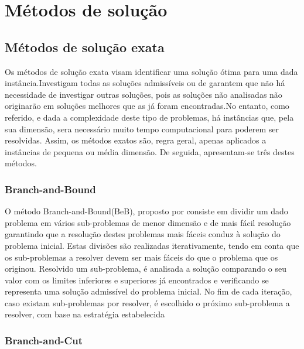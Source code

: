 ﻿\chapter{Métodos de solução}
\label{cap:Metodos_sol}

\section{Métodos de solução exata}
 

Os métodos de solução exata visam identificar uma solução ótima para uma dada instância.Investigam todas as soluções admissíveis ou de garantem que não há necessidade de investigar outras soluções, pois as soluções não analisadas não originarão em soluções melhores que as já foram encontradas.No entanto, como referido, e dada a complexidade deste tipo de problemas, há instâncias que, pela sua dimensão, sera necessário muito tempo computacional para poderem ser resolvidas. Assim, os métodos exatos são, regra geral, apenas aplicados a instâncias de pequena ou média dimensão. De seguida, apresentam-se três destes métodos.
 
\subsection{Branch-and-Bound}

O método Branch-and-Bound(BeB), proposto por \cite{land60}consiste em dividir um dado problema em vários sub-problemas de menor dimensão e de mais fácil resolução garantindo que a resolução destes problemas mais fáceis conduz à solução do problema inicial. Estas divisões são realizadas iterativamente, tendo em conta que os sub-problemas a resolver devem ser mais fáceis do que o problema que os originou. Resolvido um sub-problema, é analisada a solução comparando o seu valor com os limites inferiores e superiores já encontrados e verificando se representa uma solução admissível do problema inicial. No fim de cada iteração, caso existam sub-problemas por resolver, é escolhido o próximo sub-problema a resolver, com base na estratégia estabelecida

\subsection{Branch-and-Cut}

